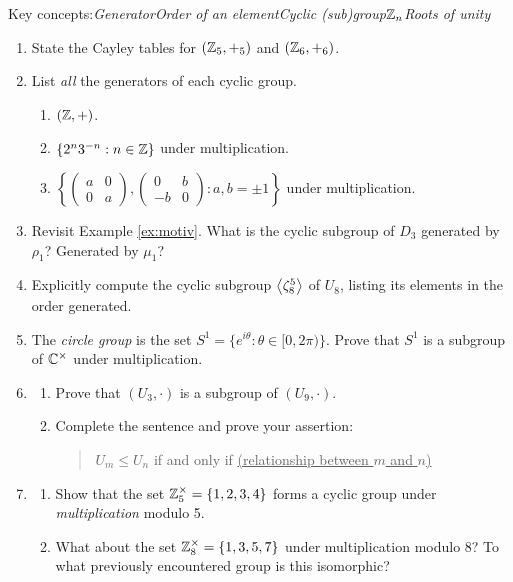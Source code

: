 \begin{exercises}
	Key concepts:\quad \emph{Generator\quad Order of an element\quad Cyclic (sub)group\quad $\mathbb{Z}_n$\quad Roots of unity}
	
	\begin{enumerate}
	  \item State the Cayley tables for $(\mathbb{Z}_5,+_5)$ and $(\mathbb{Z}_6,+_6)$.
	  
	  
		\item List \emph{all} the generators of each cyclic group.
	  \begin{enumerate}
	      \item $(\mathbb{Z},+)$.
	      \item $\{2^n3^{-n}:n\in\mathbb{Z}\}$ under multiplication.
	      \item $\left\{\begin{pmatrix} a&0\\0&a \end{pmatrix},\begin{pmatrix} 0&b\\-b&0 \end{pmatrix}: a,b=\pm 1\right\}$ under multiplication.
	  \end{enumerate}
	  
	
	  \item Revisit Example \ref{ex:motiv}. What is the cyclic subgroup of $D_3$ generated by $\rho_1$? Generated by $\mu_1$?
	  
	  
	  \item Explicitly compute the cyclic subgroup $\left\langle \zeta_8^5\right\rangle$ of $U_8$, listing its elements in the order generated. 
	  
	  
	  \item\label{exs:circle} The \emph{circle group} is the set $S^1=\{e^{i\theta}:\theta\in [0,2\pi)\}$. Prove that $S^1$ is a subgroup of $\mathbb{C}^\times$ under multiplication.
	  
	  
		\item\begin{enumerate}
		  \item Prove that $(U_3,\cdot)$ is a subgroup of $(U_9,\cdot)$.
		  \item Complete the sentence and prove your assertion:
		  \begin{quote}
		  $U_m\le U_n$ if and only if \underline{\qquad\scriptsize(relationship between $m$ and $n$)\qquad}
		  \end{quote}
		\end{enumerate}
	  
	  
	  \item\begin{enumerate}
	    \item\label{exs:z5times} Show that the set $\mathbb{Z}_5^\times=\{1,2,3,4\}$ forms a cyclic group under \emph{multiplication} modulo 5.
	    \item What about the set $\mathbb{Z}_8^\times=\{1,3,5,7\}$ under multiplication modulo 8? To what previously encountered group is this isomorphic?
	  \end{enumerate}
	    

\end{enumerate}
\end{exercises}
